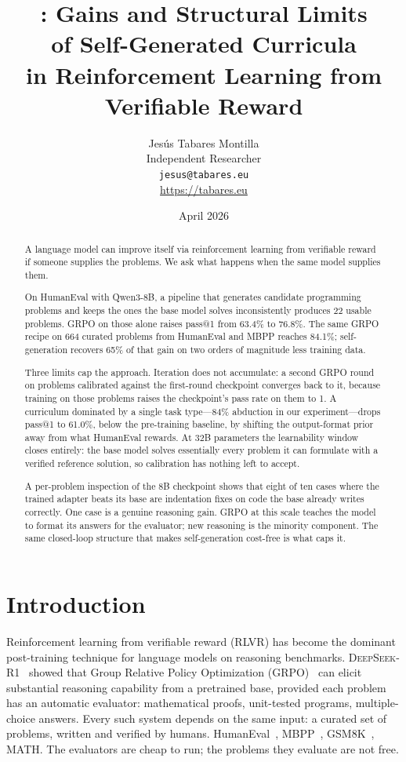\documentclass[11pt,a4paper]{article}
\title{\laimark{}: Gains and Structural Limits\\
of Self-Generated Curricula\\
in Reinforcement Learning from Verifiable Reward}
\author{Jes\'us Tabares Montilla\\
Independent Researcher\\
\texttt{jesus@tabares.eu}\\
\url{https://tabares.eu}}
\date{April 2026}
\begin{document}
\maketitle

\begin{abstract}
A language model can improve itself via reinforcement learning from verifiable reward if someone supplies the problems.
We ask what happens when the same model supplies them.

On HumanEval with Qwen3-8B, a pipeline that generates candidate programming problems and keeps the ones the base model solves inconsistently produces 22 usable problems.
GRPO on those alone raises pass@1 from 63.4\% to 76.8\%.
The same GRPO recipe on 664 curated problems from HumanEval and MBPP reaches 84.1\%; self-generation recovers 65\% of that gain on two orders of magnitude less training data.

Three limits cap the approach.
Iteration does not accumulate: a second GRPO round on problems calibrated against the first-round checkpoint converges back to it, because training on those problems raises the checkpoint's pass rate on them to 1.
A curriculum dominated by a single task type---84\% abduction in our experiment---drops pass@1 to 61.0\%, below the pre-training baseline, by shifting the output-format prior away from what HumanEval rewards.
At 32B parameters the learnability window closes entirely: the base model solves essentially every problem it can formulate with a verified reference solution, so calibration has nothing left to accept.

A per-problem inspection of the 8B checkpoint shows that eight of ten cases where the trained adapter beats its base are indentation fixes on code the base already writes correctly.
One case is a genuine reasoning gain.
GRPO at this scale teaches the model to format its answers for the evaluator; new reasoning is the minority component.
The same closed-loop structure that makes self-generation cost-free is what caps it.
\end{abstract}

\section{Introduction}
\label{sec:intro}

Reinforcement learning from verifiable reward (RLVR) has become the dominant post-training technique for language models on reasoning benchmarks.
\textsc{DeepSeek-R1}~\citep{deepseek2025r1} showed that Group Relative Policy Optimization (GRPO)~\citep{shao2024grpo} can elicit substantial reasoning capability from a pretrained base, provided each problem has an automatic evaluator: mathematical proofs, unit-tested programs, multiple-choice answers.
Every such system depends on the same input: a curated set of problems, written and verified by humans.
HumanEval~\citep{chen2021codex}, MBPP~\citep{austin2021mbpp}, GSM8K~\citep{cobbe2021training}, MATH.
The evaluators are cheap to run; the problems they evaluate are not free.
\end{document}
